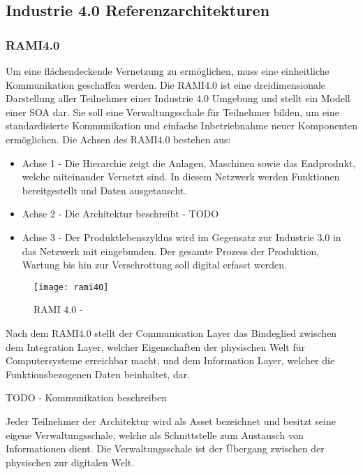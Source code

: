 \subsection{Industrie 4.0 Referenzarchitekturen}
\subsubsection{\ac{RAMI4.0}}
Um eine flächendeckende Vernetzung zu ermöglichen, muss eine einheitliche Kommunikation geschaffen werden. Die \ac{RAMI4.0} ist eine dreidimensionale Darstellung aller Teilnehmer einer Industrie 4.0 Umgebung und stellt ein Modell einer \ac{SOA} dar. Sie soll eine Verwaltungsschale für Teilnehmer bilden, um eine standardisierte Kommunikation und einfache Inbetriebnahme neuer Komponenten ermöglichen. \cite{rami2016} Die Achsen des \ac{RAMI4.0} bestehen aus:

\begin{itemize}
  \item Achse 1 - Die Hierarchie zeigt die Anlagen, Maschinen sowie das Endprodukt, welche miteinander Vernetzt sind. In diesem Netzwerk werden Funktionen bereitgestellt und Daten ausgetauscht.
  \item Achse 2 - Die Architektur beschreibt - TODO
  \item Achse 3 - Der Produktlebenszyklus wird im Gegensatz zur Industrie 3.0 in das Netzwerk mit eingebunden. Der gesamte Prozess der Produktion, Wartung bis hin zur Verschrottung soll digital erfasst werden.
\end{itemize}

\begin{figure}[h]
  \centering
  \texttt{[image: rami40]}
  \caption{RAMI 4.0 - \cite{rami2016}}
  \label{Kap2:RAMI 4.0}
\end{figure}

\clearpage

Nach dem \ac{RAMI4.0} stellt der Communication Layer das Bindeglied zwischen dem Integration Layer, welcher Eigenschaften der physischen Welt für Computersysteme erreichbar macht, und dem Information Layer, welcher die Funktionsbezogenen Daten beinhaltet, dar. \cite{BMWiNeCon2016} 

TODO - Kommunikation beschreiben

Jeder Teilnehmer der Architektur wird als Asset bezeichnet und besitzt seine eigene Verwaltungsschale, welche als Schnittstelle zum Austausch von Informationen dient. Die Verwaltungsschale ist der Übergang zwischen der physischen zur digitalen Welt.

